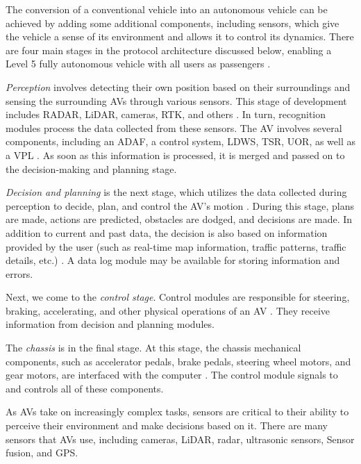 \documentclass[a4paper,12pt]{article}
\begin{document}
\hspace{5mm} The conversion of a conventional vehicle into an autonomous vehicle can be achieved by adding some additional components, including sensors, which give the vehicle a sense of its environment and allows it to control its dynamics. There are four main stages in the protocol architecture discussed below, enabling a Level 5 fully autonomous vehicle with all users as passengers \cite{article24}. \par

 \textit{Perception} involves detecting their own position based on their surroundings and sensing the surrounding AVs through various sensors. This stage of development includes RADAR, LiDAR, cameras, RTK, and others \cite{article24}. In turn, recognition modules process the data collected from these sensors. The AV involves several components, including an ADAF, a control system, LDWS, TSR, UOR, as well as a VPL \cite{article24}. As soon as this information is processed, it is merged and passed on to the decision-making and planning stage. \par

 \textit{Decision and planning} is the next stage, which utilizes the data collected during perception to decide, plan, and control the AV's motion \cite{article24}. During this stage, plans are made, actions are predicted, obstacles are dodged, and decisions are made. In addition to current and past data, the decision is also based on information provided by the user (such as real-time map information, traffic patterns, traffic details, etc.) \cite{article24}. A data log module may be available for storing information and errors. \par

Next, we come to the \textit{control stage}. Control modules are responsible for steering, braking, accelerating, and other physical operations of an AV \cite{article24}. They receive information from decision and planning modules. \par

The \textit{chassis} is in the final stage. At this stage, the chassis mechanical components, such as accelerator pedals, brake pedals, steering wheel motors, and gear motors, are interfaced with the computer \cite{article24}. The control module signals to and controls all of these components.

As AVs take on increasingly complex tasks, sensors are critical to their ability to perceive their environment and make decisions based on it. There are many sensors that AVs use, including cameras, LiDAR, radar, ultrasonic sensors, Sensor fusion, and GPS. \par
\end{document}
